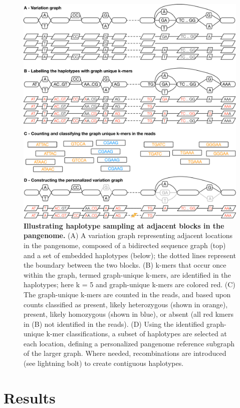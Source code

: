 \documentclass[11pt]{ucthesis}
\begin{document}
\begin{figure}[H]
    \centering
    \includegraphics[width=\linewidth]{Images/figure1.pdf}
    \caption[Illustrating haplotype sampling at adjacent blocks in the pangenome]{\textbf{Illustrating haplotype sampling at adjacent blocks in the pangenome.} (A) A variation
graph representing adjacent locations in the pangenome, composed of a bidirected sequence graph (top) and
a set of embedded haplotypes (below); the dotted lines represent the boundary between the two blocks.
(B) k-mers that occur once within the graph, termed graph-unique k-mers, are identified in the haplotypes;
here k = 5 and graph-unique k-mers are colored red. (C) The graph-unique k-mers are counted in the reads, and based upon
counts classified as present, likely heterozygous (shown in orange), present, likely homozygous (shown in
blue), or absent (all red kmers in (B) not identified in the reads). (D) Using the identified graph-unique
k-mer classifications, a subset of haplotypes are selected at each location, defining a personalized pangenome
reference subgraph of the larger graph. Where needed, recombinations are introduced (see lightning bolt) to
create contiguous haplotypes.}
    \label{fig:1:1}
\end{figure}

\section{Results}
\end{document}
